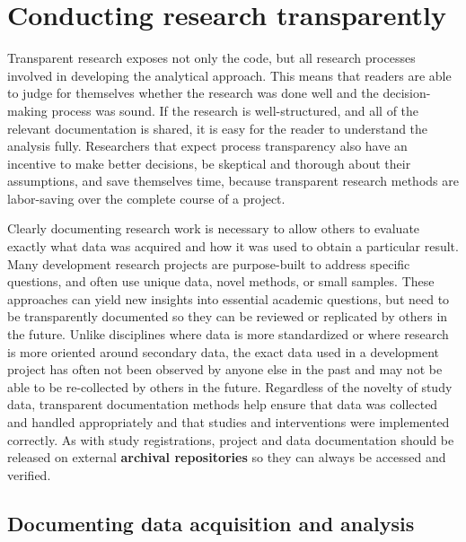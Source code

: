 \section{Conducting research transparently}
Transparent research exposes not only the code,
but all research processes involved in developing the analytical approach.
This means that readers are able to judge for themselves whether the research was done well
and the decision-making process was sound.
If the research is well-structured, and all of the relevant documentation
is shared, it is easy for the reader to understand the analysis fully.
Researchers that expect process transparency also have an incentive to make better decisions,
be skeptical and thorough about their assumptions,
and save themselves time,
because transparent research methods are labor-saving over the complete course of a project.

Clearly documenting research work is necessary
to allow others to evaluate exactly what data was acquired and how it was used
to obtain a particular result.
Many development research projects are purpose-built
to address specific questions,
and often use unique data, novel methods, or small samples.
These approaches can yield new insights into essential academic questions,
but need to be transparently documented so they can be reviewed
or replicated by others in the future.
Unlike disciplines where data is more standardized
or where research is more oriented around secondary data,
 the exact data used in a development project
has often not been observed by anyone else in the past
and may not be able to be re-collected by others in the future.
Regardless of the novelty of study data,
transparent documentation methods help ensure
that data was collected and handled appropriately
and that studies and interventions were implemented correctly.
As with study registrations, project and data documentation
should be released on external \textbf{archival repositories}
so they can always be accessed and verified.

\subsection{Documenting data acquisition and analysis}

